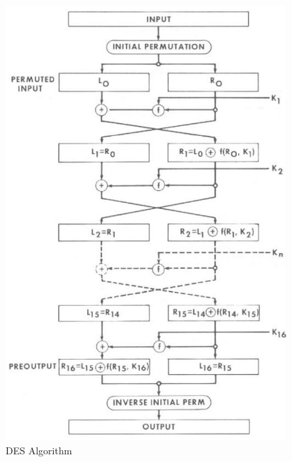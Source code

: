 \documentclass[9pt]{beamer}
\begin{document}
\begin{frame}
\begin{columns}
\begin{column}{0.6\textwidth}
\end{column}
\begin{column}{0.4\textwidth}
\begin{figure}
\includegraphics[totalheight=0.8\textheight]{des_algo.jpg}
\caption{DES Algorithm}
\end{figure}
\end{column}
\end{columns}
\end{frame}
\end{document}
